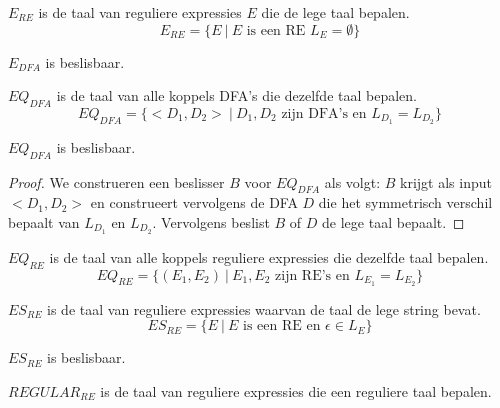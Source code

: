 \documentclass[main.tex]{subfiles}
\begin{document}
\begin{de}
  \label{de:e-re}
  $E_{RE}$ is de taal van reguliere expressies $E$ die de lege taal bepalen.
  \[ E_{RE} = \{ E\ |\ E \text{ is een RE } L_{E} = \emptyset \} \]
\end{de}


\begin{st}
  \label{st:e-re}
  $E_{DFA}$ is beslisbaar.
\end{st}


\begin{de}
  \label{de:eq-dfa}
  $EQ_{DFA}$ is de taal van alle koppels DFA's die dezelfde taal bepalen.
  \[ EQ_{DFA} = \{ <D_{1},D_{2}> \ |\ D_{1},D_{2} \text{ zijn DFA's en } L_{D_{1}} = L_{D_{2}} \} \]  
\end{de}

\begin{st}
  \label{st:eq-dfa-besl}
  $EQ_{DFA}$ is beslisbaar.

  \begin{proof}
    We construeren een beslisser $B$ voor $EQ_{DFA}$ als volgt:
    $B$ krijgt als input $<D_{1},D_{2}>$ en construeert vervolgens de DFA $D$ die het symmetrisch verschil bepaalt van $L_{D_{1}}$ en $L_{D_{2}}$.
    Vervolgens beslist $B$ of $D$ de lege taal bepaalt.
  \end{proof}
\end{st}

\begin{de}
  \label{de:eq-re}
  $EQ_{RE}$ is de taal van alle koppels reguliere expressies die dezelfde taal bepalen.
  \[ EQ_{RE} = \{ (E_{1},E_{2}) \ |\ E_{1},E_{2} \text{ zijn RE's en } L_{E_{1}} = L_{E_{2}} \} \]  
\end{de}

\begin{st}
  \label{st:eq-re-besl}
\end{st}

\begin{de}
  \label{de:es-re}
  $ES_{RE}$ is de taal van reguliere expressies waarvan de taal de lege string bevat.
  \[ ES_{RE} = \{ E \ |\ E \text{ is een RE en } \epsilon \in L_{E}\} \]
\end{de}

\begin{st}
  \label{st:es-re}
  $ES_{RE}$ is beslisbaar.
\end{st}

\begin{de}
  \label{de:regular-re}
  $REGULAR_{RE}$ is de taal van reguliere expressies die een reguliere taal bepalen.
\end{de}
\end{document}
